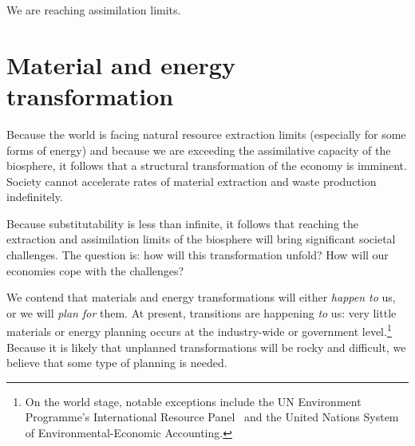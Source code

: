 We are reaching assimilation limits.


\section{Material and energy transformation}

Because the world is facing natural resource extraction limits
(especially for some forms of energy)
and because we are exceeding the assimilative capacity of the biosphere,
it follows that a structural transformation of the economy is imminent.
Society cannot accelerate rates of material extraction
and waste production indefinitely.

Because substitutability is less than infinite, 
it follows that reaching the extraction and assimilation limits 
of the biosphere will bring significant societal challenges.
The question is: how will this transformation unfold?
How will our economies cope with the challenges?

We contend that materials and energy transformations will either  
\emph{happen to} us, or we will \emph{plan for} them.
At present,
transitions are happening \emph{to} us:
very little materials or energy planning occurs
at the industry-wide or government level.\footnote{On the world stage, 
	notable exceptions include the UN Environment Programme's 
	International Resource Panel~\cite{UNEP-IRP:aa}
	and the United Nations System of Environmental-Economic Accounting.\cite{UNSEEA:aa}
	}
Because it is likely that unplanned transformations will be rocky and difficult,
we believe that some type of planning is needed.

